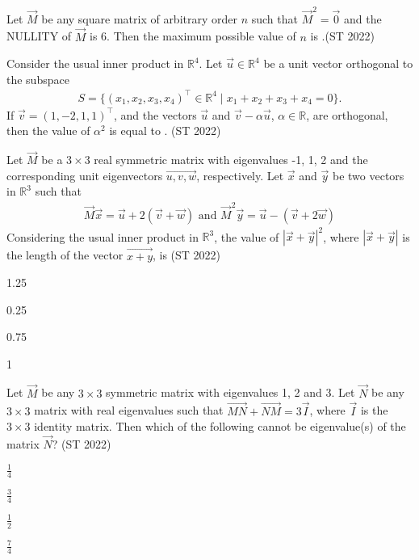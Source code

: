 \item Let $\vec{M}$ be any square matrix of arbitrary order $n$ such that $\vec{M}^2  = \vec{0}$ and the NULLITY of $\vec{M}$ is 6. Then the maximum possible value of $n$ is \underline{\hspace{2cm}}.\hfill (ST 2022)
\item Consider the usual inner product in $\mathbb{R}^4$. 
Let $\vec{u} \in \mathbb{R}^4$ be a unit vector orthogonal to the subspace
\begin{align*}
S = \{ (x_1, x_2, x_3, x_4)^{\top} \in \mathbb{R}^4 
\mid x_1 + x_2 + x_3 + x_4 = 0 \}.
\end{align*}
If $\vec{v} = (1, -2, 1, 1)^{\top}$, and the vectors $\vec{u}$ and 
$\vec{v} - \alpha \vec{u}$, $\alpha \in \mathbb{R}$, are orthogonal, 
then the value of $\alpha^2$  is equal to 
\underline{\hspace{2cm}}. \hfill (ST 2022)
\item Let $\vec{M}$ be a $3 \times 3$ real symmetric matrix with eigenvalues -1, 1, 2 and the corresponding unit eigenvectors $\vec{u, v, w}$, respectively. Let $\vec{x}$ and $\vec{y}$ be two vectors in $\mathbb{R}^3$ such that
\begin{align*}
\vec{M} \vec{x} = \vec{u} + 2(\vec{v} + \vec{w})  \text{ and }  \vec{M}^2\vec{y} = \vec{u} -(\vec{v} + 2\vec{w})
\end{align*}
Considering the usual inner product in $\mathbb{R}^3$, the value of ${|\vec{x} + \vec{y}|}^2$, where $|\vec{x} + \vec{y}|$ is the length of the vector $\vec{x + y}$, is
	\hfill (ST 2022)
\begin{enumerate} 
\end{enumerate}
\item Let $\vec{M}$ be any $3 \times 3$ symmetric matrix with eigenvalues 1, 2 and 3. Let $\vec{N}$ be any $3 \times 3$ matrix with real eigenvalues such that $\vec{MN} + \vec{NM} = 3\vec{I}$, where $\vec{I}$ is the $3 \times 3$ identity matrix. Then which of the following cannot be eigenvalue(s) of the matrix $\vec{N}$?
	\hfill (ST 2022)
\begin{enumerate} 
		 \begin{multicols}{4}
	\item $\frac{1}{4}$ 
	\item $\frac{3}{4}$
	\item $\frac{1}{2}$
	\item $\frac{7}{4}$
	\end{multicols}
\end{enumerate}
